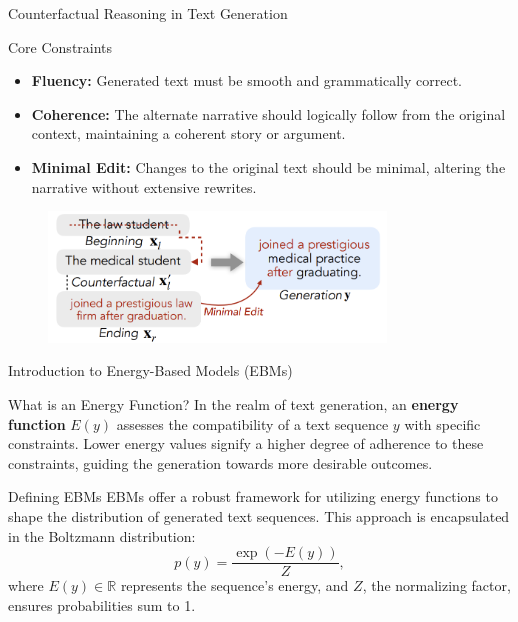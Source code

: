 \documentclass{beamer}
\begin{document}
\begin{frame}{Counterfactual Reasoning in Text Generation}

    \begin{block}{Core Constraints}
        \begin{itemize}
            \item \textbf{Fluency:} Generated text must be smooth and grammatically correct.
            \item \textbf{Coherence:} The alternate narrative should logically follow from the original context, maintaining a coherent story or argument.
            \item \textbf{Minimal Edit:} Changes to the original text should be minimal, altering the narrative without extensive rewrites.
        \end{itemize}
    \end{block}

    \begin{figure}
        \centering
        \includegraphics[width=0.8\textwidth]{constraint3.png}
    \end{figure}
\end{frame}

\begin{frame}{Introduction to Energy-Based Models (EBMs)}
    \begin{block}{What is an Energy Function?}
        In the realm of text generation, an \textbf{energy function} $E(y)$ assesses the compatibility of a text sequence $y$ with specific constraints. Lower energy values signify a higher degree of adherence to these constraints, guiding the generation towards more desirable outcomes.
    \end{block}

    \begin{block}{Defining EBMs}
        EBMs offer a robust framework for utilizing energy functions to shape the distribution of generated text sequences. This approach is encapsulated in the Boltzmann distribution:
        \begin{equation}
            p(y) = \frac{\exp(-E(y))}{Z},
        \end{equation}
        where $E(y) \in \mathbb{R}$ represents the sequence's energy, and $Z$, the normalizing factor, ensures probabilities sum to 1.
    \end{block}
\end{frame}
\end{document}
